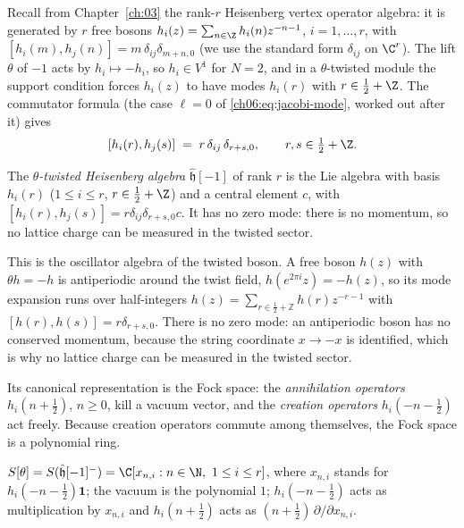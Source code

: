 Recall from Chapter~\ref{ch:03} the rank-$r$ Heisenberg vertex operator algebra: it is generated by
$r$ free bosons $h_i(z)=\sum_{n\in\Z}h_i(n)z^{-n-1}$, $i=1,\dots,r$, with
$[h_i(m),h_j(n)]=m\,\delta_{ij}\delta_{m+n,0}$ (we use the standard form $\delta_{ij}$ on
$\C^r$).  The lift $\theta$ of $-1$ acts by $h_i\mapsto-h_i$, so $h_i\in V^1$ for $N=2$, and in a
$\theta$-twisted module the support condition forces $h_i(z)$ to have modes $h_i(r)$ with
$r\in\frac12+\Z$.  The commutator formula (the case $\ell=0$ of \eqref{ch06:eq:jacobi-mode},
worked out after it) gives
\begin{equation}\label{ch06:eq:twheis}
  [h_i(r),h_j(s)] \;=\; r\,\delta_{ij}\,\delta_{r+s,0},\qquad r,s\in\tfrac12+\Z .
\end{equation}
\begin{definition}\label{ch06:def:twheis}
The \emph{$\theta$-twisted Heisenberg algebra} $\hat{\mathfrak h}[-1]$ of rank $r$ is the Lie
algebra with basis $h_i(r)$ ($1\le i\le r$, $r\in\frac12+\Z$) and a central element $c$, with
$[h_i(r),h_j(s)]=r\delta_{ij}\delta_{r+s,0}c$.  It has no zero mode: there is no momentum, so no
lattice charge can be measured in the twisted sector.
\end{definition}

\begin{physics}
This is the oscillator algebra of the twisted boson. A free boson $h(z)$ with $\theta h=-h$ is antiperiodic around the twist field, $h(e^{2\pi i}z)=-h(z)$, so its mode expansion runs over half-integers $h(z)=\sum_{r\in\frac12+\mathbb Z}h(r)z^{-r-1}$ with $[h(r),h(s)]=r\delta_{r+s,0}$. There is no zero mode: an antiperiodic boson has no conserved momentum, because the string coordinate $x\to-x$ is identified, which is why no lattice charge can be measured in the twisted sector.
\end{physics}
Its canonical representation is the Fock space: the \emph{annihilation operators} $h_i(n+\frac12)$,
$n\ge 0$, kill a vacuum vector, and the \emph{creation operators} $h_i(-n-\frac12)$ act freely.
Because creation operators commute among themselves, the Fock space is a polynomial ring.
\begin{definition}\label{ch06:def:fockT}
$\chsixS=S(\hat{\mathfrak h}[-1]^-)=\C[x_{n,i}: n\in\N,\ 1\le i\le r]$, where $x_{n,i}$ stands for
$h_i(-n-\frac12)\mathbf 1$; the vacuum is the polynomial $1$; $h_i(-n-\frac12)$ acts as
multiplication by $x_{n,i}$ and $h_i(n+\frac12)$ acts as $(n+\frac12)\,\partial/\partial x_{n,i}$.
\end{definition}


